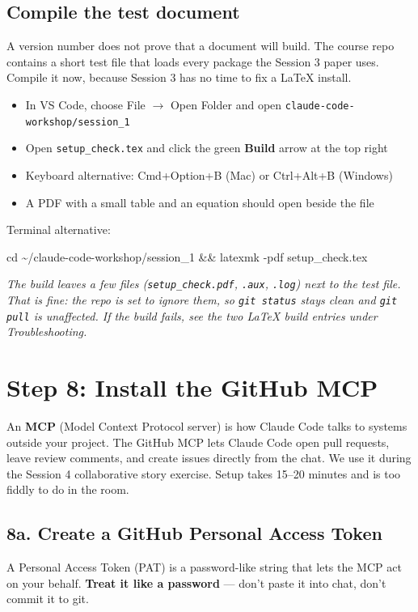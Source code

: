 \documentclass[11pt]{article}
\newcommand{\cmd}[1]{\par\vspace{0.2em}\colorbox{codegray}{\parbox{\dimexpr\linewidth-2\fboxsep}{\ttfamily\small #1}}\par\vspace{0.2em}}
\begin{document}
\subsection*{Compile the test document}
A version number does not prove that a document will build. The course repo contains a short test file that loads every package the Session 3 paper uses. Compile it now, because Session 3 has no time to fix a \LaTeX{} install.
\begin{itemize}[leftmargin=2em,itemsep=0pt]
  \item In VS Code, choose File $\rightarrow$ Open Folder and open \texttt{claude-code-workshop/session\_1}
  \item Open \texttt{setup\_check.tex} and click the green \textbf{Build} arrow at the top right
  \item Keyboard alternative: Cmd+Option+B (Mac) or Ctrl+Alt+B (Windows)
  \item A PDF with a small table and an equation should open beside the file
\end{itemize}
Terminal alternative:
\cmd{cd \textasciitilde/claude-code-workshop/session\_1 \&\& latexmk -pdf setup\_check.tex}
\textit{The build leaves a few files (\texttt{setup\_check.pdf}, \texttt{.aux}, \texttt{.log}) next to the test file. That is fine: the repo is set to ignore them, so \texttt{git status} stays clean and \texttt{git pull} is unaffected. If the build fails, see the two \LaTeX{} build entries under Troubleshooting.}

\section*{Step 8: Install the GitHub MCP}
An \textbf{MCP} (Model Context Protocol server) is how Claude Code talks to systems outside your project. The GitHub MCP lets Claude Code open pull requests, leave review comments, and create issues directly from the chat. We use it during the Session 4 collaborative story exercise. Setup takes 15--20 minutes and is too fiddly to do in the room.

\subsection*{8a. Create a GitHub Personal Access Token}

A Personal Access Token (PAT) is a password-like string that lets the MCP act on your behalf. \textbf{Treat it like a password} --- don't paste it into chat, don't commit it to git.
\end{document}
